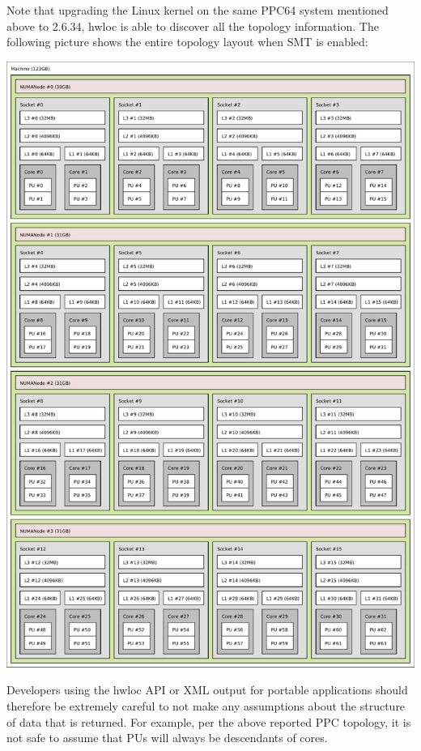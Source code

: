Note that upgrading the Linux kernel on the same PPC64 system mentioned above to 2.6.34, hwloc is able to discover all the topology information. The following picture shows the entire topology layout when SMT is enabled:

 
\begin{DoxyImageNoCaption}
  \mbox{\includegraphics[width=\textwidth]{ppc64-full-with-smt}}
\end{DoxyImageNoCaption}


Developers using the hwloc API or XML output for portable applications should therefore be extremely careful to not make any assumptions about the structure of data that is returned. For example, per the above reported PPC topology, it is not safe to assume that PUs will always be descendants of cores.


